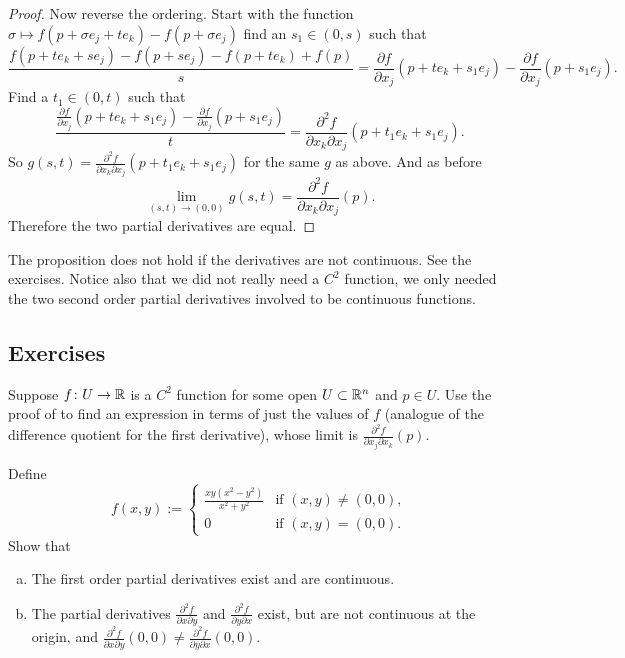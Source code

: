 \begin{proof}
Now reverse the ordering.  Start with
the function $\sigma \mapsto f(p+\sigma e_j + te_k)-f(p + \sigma e_j)$
find an $s_1 \in (0,s)$ such that
\begin{equation*}
\frac{f(p+te_k + se_j)- f(p+s e_j) - f(p+t e_k)+f(p)}{s}
=
\frac{\partial f}{\partial x_j}(p + t e_k + s_1 e_j)
-
\frac{\partial f}{\partial x_j}(p + s_1 e_j) .
\end{equation*}
Find a $t_1 \in (0,t)$ such that
\begin{equation*}
\frac{\frac{\partial f}{\partial x_j}(p + t e_k + s_1 e_j)
-
\frac{\partial f}{\partial x_j}(p + s_1 e_j)}{t}
=
\frac{\partial^2 f}{\partial x_k \partial x_j}(p + t_1 e_k + s_1 e_j) .
\end{equation*}
So $g(s,t) = \frac{\partial^2 f}{\partial x_k \partial
x_j}(p + t_1 e_k + s_1 e_j)$ for the same $g$ as above.  And as before
\begin{equation*}
\lim_{(s,t) \to (0,0)} g(s,t) = 
\frac{\partial^2 f}{\partial x_k \partial x_j}(p) .
\end{equation*}
Therefore the two partial derivatives are equal.
\end{proof}

The proposition does not hold if the derivatives are not
continuous.  See the exercises.
Notice also that we did not really need a $C^2$ function, we only needed the
two second order partial derivatives involved to be continuous functions.

\subsection{Exercises}

\begin{exercise}
Suppose $f \colon U \to {\mathbb{R}}$ is a $C^2$ function for some open $U \subset
{\mathbb{R}}^n$ and $p \in U$.
Use the proof of  to find an expression
in terms of just the values of $f$ (analogue of the difference quotient
for the first derivative), whose limit is
$\frac{\partial^2 f}{ \partial x_j \partial x_k}(p)$.
\end{exercise}

\begin{exercise}
Define
\begin{equation*}
f(x,y) :=
\begin{cases}
\frac{xy(x^2-y^2)}{x^2+y^2} & \text{if } (x,y) \not= (0,0),\\
0                           & \text{if } (x,y) = (0,0).
\end{cases}
\end{equation*}
Show that
\begin{enumerate}[a)]
\item
The first order partial derivatives exist and are continuous.
\item
The partial derivatives
$\frac{\partial^2 f}{\partial x \partial y}$ and
$\frac{\partial^2 f}{\partial y \partial x}$ exist, but are not continuous
at the origin, and 
$\frac{\partial^2 f}{\partial x \partial y}(0,0) \not= 
\frac{\partial^2 f}{\partial y \partial x}(0,0)$.
\end{enumerate}
\end{exercise}

